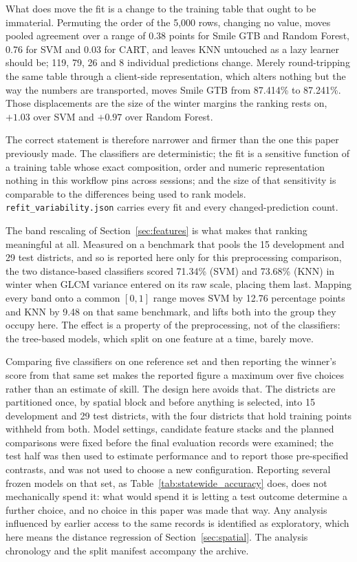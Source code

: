 \documentclass[conference]{IEEEtran}
\begin{document}
What does move the fit is a change to the training table that ought to be immaterial. Permuting the order of the 5{,}000 rows, changing no value, moves pooled agreement over a range of 0.38 points for Smile GTB and Random Forest, 0.76 for SVM and 0.03 for CART, and leaves KNN untouched as a lazy learner should be; 119, 79, 26 and 8 individual predictions change. Merely round-tripping the same table through a client-side representation, which alters nothing but the way the numbers are transported, moves Smile GTB from 87.414\% to 87.241\%. Those displacements are the size of the winter margins the ranking rests on, $+1.03$ over SVM and $+0.97$ over Random Forest.

The correct statement is therefore narrower and firmer than the one this paper previously made. The classifiers are deterministic; the fit is a sensitive function of a training table whose exact composition, order and numeric representation nothing in this workflow pins across sessions; and the size of that sensitivity is comparable to the differences being used to rank models. \texttt{refit\_variability.json} carries every fit and every changed-prediction count.

The band rescaling of Section~\ref{sec:features} is what makes that ranking meaningful at all. Measured on a benchmark that pools the 15 development and 29 test districts, and so is reported here only for this preprocessing comparison, the two distance-based classifiers scored 71.34\% (SVM) and 73.68\% (KNN) in winter when GLCM variance entered on its raw scale, placing them last. Mapping every band onto a common $[0, 1]$ range moves SVM by 12.76 percentage points and KNN by 9.48 on that same benchmark, and lifts both into the group they occupy here. The effect is a property of the preprocessing, not of the classifiers: the tree-based models, which split on one feature at a time, barely move.

Comparing five classifiers on one reference set and then reporting the winner's score from that same set makes the reported figure a maximum over five choices rather than an estimate of skill. The design here avoids that. The districts are partitioned once, by spatial block and before anything is selected, into 15 development and 29 test districts, with the four districts that hold training points withheld from both. Model settings, candidate feature stacks and the planned comparisons were fixed before the final evaluation records were examined; the test half was then used to estimate performance and to report those pre-specified contrasts, and was not used to choose a new configuration. Reporting several frozen models on that set, as Table~\ref{tab:statewide_accuracy} does, does not mechanically spend it: what would spend it is letting a test outcome determine a further choice, and no choice in this paper was made that way. Any analysis influenced by earlier access to the same records is identified as exploratory, which here means the distance regression of Section~\ref{sec:spatial}. The analysis chronology and the split manifest accompany the archive.
\end{document}
